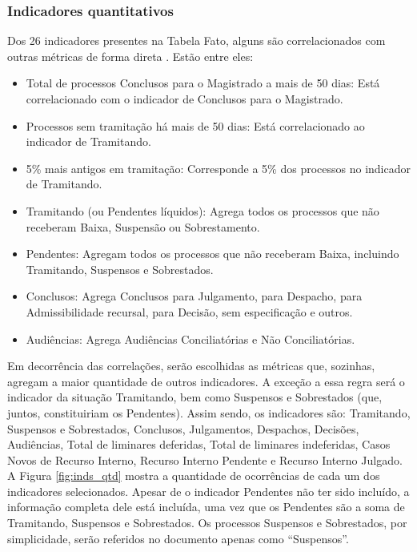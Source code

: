 \subsubsection{Indicadores quantitativos}
Dos 26 indicadores presentes na Tabela Fato, alguns são correlacionados com outras métricas de forma direta \cite{painelestatistica}. Estão entre eles:
\begin{itemize}
    \item Total de processos Conclusos para o Magistrado a mais de 50 dias: Está correlacionado com o indicador de Conclusos para o Magistrado.
    \item Processos sem tramitação há mais de 50 dias: Está correlacionado ao indicador de Tramitando.
    \item 5\% mais antigos em tramitação: Corresponde a 5\% dos processos no indicador de Tramitando.
    \item Tramitando (ou Pendentes líquidos): Agrega todos os processos que não receberam Baixa, Suspensão ou Sobrestamento.
    \item Pendentes: Agregam todos os processos que não receberam Baixa, incluindo Tramitando, Suspensos e Sobrestados.
    \item Conclusos: Agrega Conclusos para Julgamento, para Despacho, para Admissibilidade recursal, para Decisão, sem especificação e outros.
    \item Audiências: Agrega Audiências Conciliatórias e Não Conciliatórias.
\end{itemize}


Em decorrência das correlações, serão escolhidas as métricas que, sozinhas, agregam a maior quantidade de outros indicadores. A exceção a essa regra será o indicador da situação Tramitando, bem como Suspensos e Sobrestados (que, juntos, constituiriam os Pendentes). Assim sendo, os indicadores são: Tramitando, Suspensos e Sobrestados, Conclusos, Julgamentos, Despachos, Decisões, Audiências, Total de liminares deferidas, Total de liminares indeferidas, Casos Novos de Recurso Interno, Recurso Interno Pendente e Recurso Interno Julgado. A Figura \ref{fig:inds_qtd} mostra a quantidade de ocorrências de cada um dos indicadores selecionados. Apesar de o indicador Pendentes não ter sido incluído, a informação completa dele está incluída, uma vez que os Pendentes são a soma de Tramitando, Suspensos e Sobrestados. Os processos Suspensos e Sobrestados, por simplicidade, serão referidos no documento apenas como “Suspensos”.

